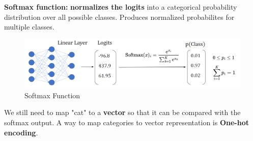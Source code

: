 \begin{definition}
    \textbf{Softmax function:} \textbf{normalizes the logits} into a categorical probability distribution over all possible classes. Produces normalized probabilites for multiple classes.
\end{definition}

\begin{figure}[h!t]
    \centering
    \includegraphics[width=0.75\linewidth]{softmax.png}
    \caption{Softmax Function}
    \label{fig:enter-label}
\end{figure}
We still need to map "cat" to a \textbf{vector} so that it can be compared with the softmax output. A way to map categories to vector representation is \textbf{One-hot encoding}.

